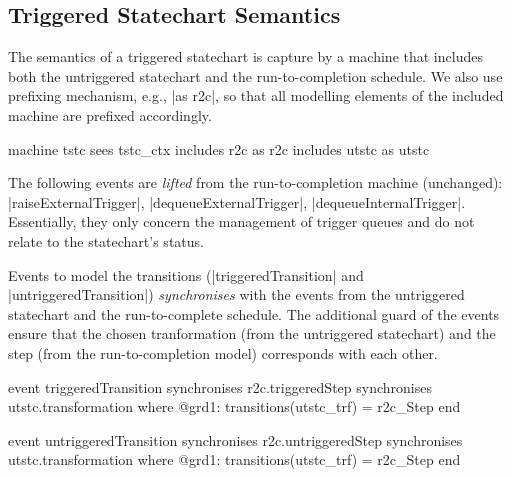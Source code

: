 \subsection{Triggered Statechart Semantics}
\label{sec:tstc-semantics}
The semantics of a triggered statechart is capture by a machine that includes both the untriggered statechart and the run-to-completion schedule. We also use prefixing mechanism, e.g., |as r2c|, so that all modelling elements of the included machine are prefixed accordingly.
\begin{EventBcode}
machine tstc sees tstc_ctx
includes r2c as r2c
includes utstc as utstc
\end{EventBcode}
The following events are \emph{lifted} from the run-to-completion machine (unchanged): |raiseExternalTrigger|, |dequeueExternalTrigger|, |dequeueInternalTrigger|. Essentially, they only concern the management of trigger queues and do not relate to the statechart's status.

Events to model the transitions (|triggeredTransition| and |untriggeredTransition|) \emph{synchronises} with the events from the untriggered statechart and the run-to-complete schedule. The additional guard of the events ensure that the chosen tranformation (from the untriggered statechart) and the step (from the run-to-completion model) corresponds with each other.
\begin{center}
    \begin{minipage}{0.48\textwidth}
\begin{EventBcode}
event triggeredTransition
synchronises r2c.triggeredStep
synchronises utstc.transformation
where 
	@grd1: transitions(utstc_trf) = r2c_Step 
end
\end{EventBcode}
    \end{minipage}
    \hfill
    \begin{minipage}{0.48\textwidth}
\begin{EventBcode}
event untriggeredTransition
synchronises r2c.untriggeredStep
synchronises utstc.transformation
where 
	@grd1: transitions(utstc_trf) = r2c_Step 
end    
\end{EventBcode}
    \end{minipage}
\end{center}

